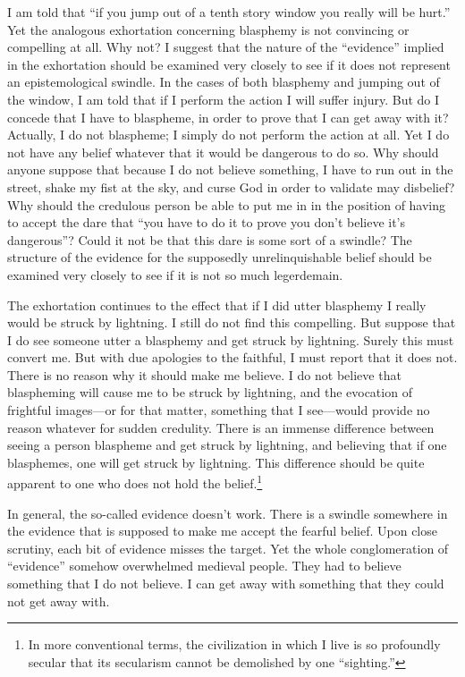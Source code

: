 \visbreak

I am told that \enquote{if you jump out of a tenth story window you really will be hurt.} Yet the analogous exhortation concerning blasphemy is not convincing or compelling at all. Why not? I suggest that the nature of the \enquote{evidence} implied in the exhortation should be examined very closely to see if it does not represent an epistemological swindle. In the cases of both blasphemy and jumping out of the window, I am told that if I perform the action I will suffer injury. But do I concede that I have to blaspheme, in order to prove that I can get away with it? Actually, I do not blaspheme; I simply do not perform the action at all. Yet I do not have any belief whatever that it would be dangerous to do so. Why should anyone suppose that because I do not believe something, I have to run out in the street, shake my fist at the sky, and curse God in order to validate may disbelief? Why should the credulous person be able to put me in in the position of having to accept the dare that \enquote{you have to do it to prove you don't believe it's dangerous}? Could it not be that this dare is some sort of a swindle? The structure of the evidence for the supposedly unrelinquishable belief should be examined very closely to see if it is not so much legerdemain. 

The exhortation continues to the effect that if I did utter blasphemy I really would be struck by lightning. I still do not find this compelling. But suppose that I do see someone utter a blasphemy and get struck by lightning. Surely this must convert me. But with due apologies to the faithful, I must report that it does not. There is no reason why it should make me believe. I do not believe that blaspheming will cause me to be struck by lightning, and the evocation of frightful images---or for that matter, something that I see---would provide no reason whatever for sudden credulity. There is an immense difference between seeing a person blaspheme and get struck by lightning, and believing that if one blasphemes, one will get struck by lightning. This difference should be quite apparent to one who does not hold the belief.\footnote{In more conventional terms, the civilization in which I live is so profoundly secular that its secularism cannot be demolished by one \enquote{sighting.}}

In general, the so-called evidence doesn't work. There is a swindle somewhere in the evidence that is supposed to make me accept the fearful belief. Upon close scrutiny, each bit of evidence misses the target. Yet the whole conglomeration of \enquote{evidence} somehow overwhelmed medieval people. They had to believe something that I do not believe. I can get away with something that they could not get away with. 

